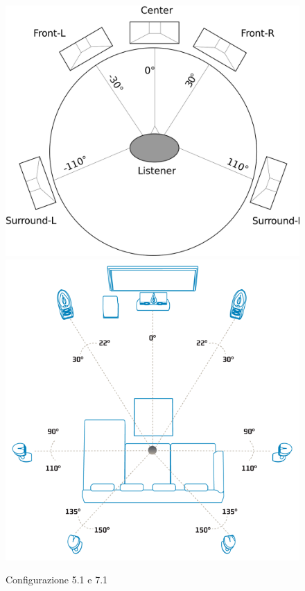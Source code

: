 \documentclass[12pt,a4paper]{report}
\begin{document}
\begin{figure}[htbp]
	\centering
	\includegraphics[scale=0.18]{figures/5-1.png}\includegraphics[scale=0.34]{figures/7-1.png}
	\caption {Configurazione 5.1 e 7.1}
	\label{fig:5.1}
	\end{figure}
\end{document}
